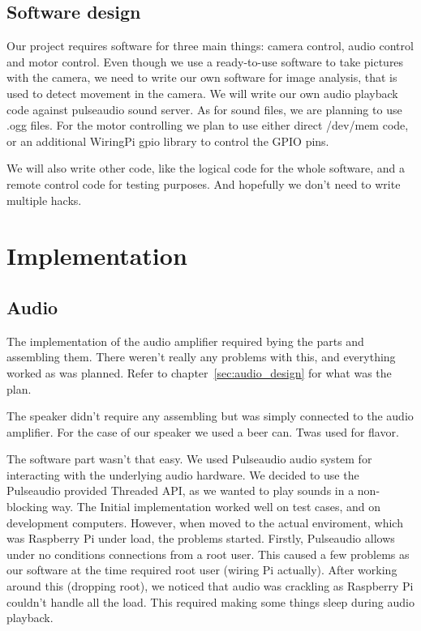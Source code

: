 \documentclass[english,11pt,twoside,a4paper]{article}
\begin{document}
\subsection{Software design}

Our project requires software for three main things: camera control, audio control and motor control. Even though we use a ready-to-use software to take pictures with the camera, we need to write our own software for image analysis, that is used to detect movement in the camera. We will write our own audio playback code against pulseaudio sound server. As for sound files, we are planning to use .ogg files. For the motor controlling we plan to use either direct /dev/mem code, or an additional WiringPi gpio library to control the GPIO pins.

We will also write other code, like the logical code for the whole software, and a remote control code for testing purposes. And hopefully we don't need to write multiple hacks.

\section{Implementation}

\subsection{Audio}

The implementation of the audio amplifier required bying the parts and assembling them. There weren't really any problems with this, and everything worked as was planned. Refer to chapter~\ref{sec:audio_design} for what was the plan.

The speaker didn't require any assembling but was simply connected to the audio amplifier. For the case of our speaker we used a beer can. Twas used for flavor.

The software part wasn't that easy. We used Pulseaudio audio system for interacting with the underlying audio hardware. We decided to use the Pulseaudio provided Threaded API, as we wanted to play sounds in a non-blocking way. The Initial implementation worked well on test cases, and on development computers. However, when moved to the actual enviroment, which was Raspberry Pi under load, the problems started. Firstly, Pulseaudio allows under no conditions connections from a root user. This caused a few problems as our software at the time required root user (wiring Pi actually). After working around this (dropping root), we noticed that audio was crackling as Raspberry Pi couldn't handle all the load. This required making some things sleep during audio playback.
\end{document}
